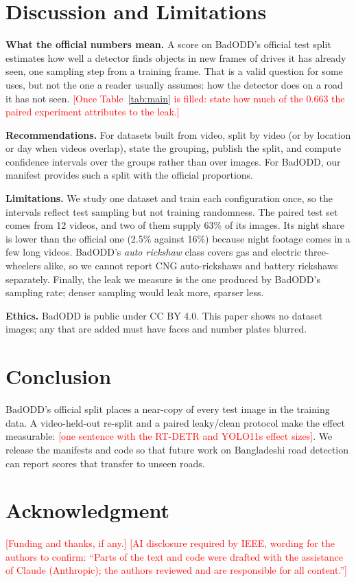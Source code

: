 \documentclass[conference]{IEEEtran}
\newcommand{\TBD}[1]{\textcolor{red}{#1}}   %
\begin{document}
\section{Discussion and Limitations}

\textbf{What the official numbers mean.} A score on BadODD's official test split estimates how well a
detector finds objects in new frames of drives it has already seen, one sampling step from a training
frame. That is a valid question for some uses, but not the one a reader usually assumes: how the detector
does on a road it has not seen. \TBD{[Once Table~\ref{tab:main} is filled: state how much of the 0.663 the
paired experiment attributes to the leak.]}

\textbf{Recommendations.} For datasets built from video, split by video (or by location or day when videos
overlap), state the grouping, publish the split, and compute confidence intervals over the groups rather
than over images. For BadODD, our manifest provides such a split with the official proportions.

\textbf{Limitations.} We study one dataset and train each configuration once, so the intervals reflect test
sampling but not training randomness. The paired test set comes from 12 videos, and two of them supply 63\%
of its images. Its night share is lower than the official one (2.5\% against 16\%) because night footage
comes in a few long videos. BadODD's \emph{auto rickshaw} class covers gas and electric three-wheelers alike,
so we cannot report CNG auto-rickshaws and battery rickshaws separately. Finally, the leak we measure is the one
produced by BadODD's sampling rate; denser sampling would leak more, sparser less.

\textbf{Ethics.} BadODD is public under CC BY 4.0. This paper shows no dataset images; any that are added
must have faces and number plates blurred.

\section{Conclusion}
BadODD's official split places a near-copy of every test image in the training data. A video-held-out
re-split and a paired leaky/clean protocol make the effect measurable: \TBD{[one sentence with the RT-DETR
and YOLO11s effect sizes]}. We release the manifests and code so that future work on Bangladeshi road
detection can report scores that transfer to unseen roads.

\section*{Acknowledgment}
\TBD{[Funding and thanks, if any.]} \TBD{[AI disclosure required by IEEE, wording for the authors to confirm:
``Parts of the text and code were drafted with the assistance of Claude (Anthropic); the authors reviewed
and are responsible for all content.'']}



\end{document}
